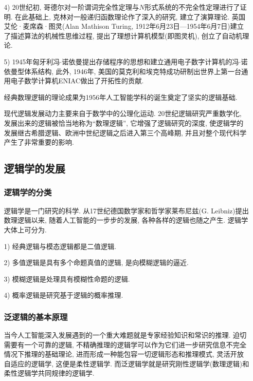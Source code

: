 4) 20世纪初, 哥德尔对一阶谓词完全性定理与$N$形式系统的不完全性定理进行了证明. 在此基础上, 克林对一般递归函数理论作了深入的研究, 建立了演算理论. 英国艾伦·麦席森·图灵(Alan Mathison Turing, 1912年6月23日—1954年6月7日)建立了描述算法的机械性思维过程, 提出了理想计算机模型(即图灵机), 创立了自动机理论.

5) 1945年匈牙利冯$\cdot$诺依曼提出存储程序的思想和建立通用电子数字计算机的冯$\cdot$诺依曼型体系结构, 此外, 1946年, 美国的莫克利和埃克特成功研制出世界上第一台通用电子数学计算机ENIAC做出了开拓性的贡献.
\begin{remark}
经典数理逻辑的理论成果为1956年人工智能学科的诞生奠定了坚实的逻辑基础.

现代逻辑发展动力主要来自于数学中的公理化运动. 20世纪逻辑研究严重数学化, 发展出来的逻辑被恰当地称为“数理逻辑”, 它增强了逻辑研究的深度, 使逻辑学的发展继古希腊逻辑、欧洲中世纪逻辑之后进入第三个高峰期, 并且对整个现代科学产生了非常重要的影响.
\end{remark}

\subsection{逻辑学的发展}
\subsubsection{逻辑学的分类}

逻辑学是一门研究的科学.  从17世纪德国数学家和哲学家莱布尼兹(G. Leibniz)提出数理逻辑以来, 随着人工智能的一步步的发展, 各种各样的逻辑也随之产生.
逻辑学大体上可分为.

1) 经典逻辑与模态逻辑都是二值逻辑.

2) 多值逻辑是具有多个命题真值的逻辑, 是向模糊逻辑的逼近.

3) 模糊逻辑是处理具有模糊性命题的逻辑.

4) 概率逻辑是研究基于逻辑的概率推理.
\subsubsection{泛逻辑的基本原理}

当今人工智能深入发展遇到的一个重大难题就是专家经验知识和常识的推理. 迫切需要有一个可靠的逻辑, 不精确推理的逻辑学可以作为它们进一步研究信息不完全情况下推理的基础理论, 进而形成一种能包容一切逻辑形态和推理模式, 灵活开放自适应的逻辑学, 这便是柔性逻辑学. 而泛逻辑学就是研究刚性逻辑学(数理逻辑)和柔性逻辑学共同规律的逻辑学.

